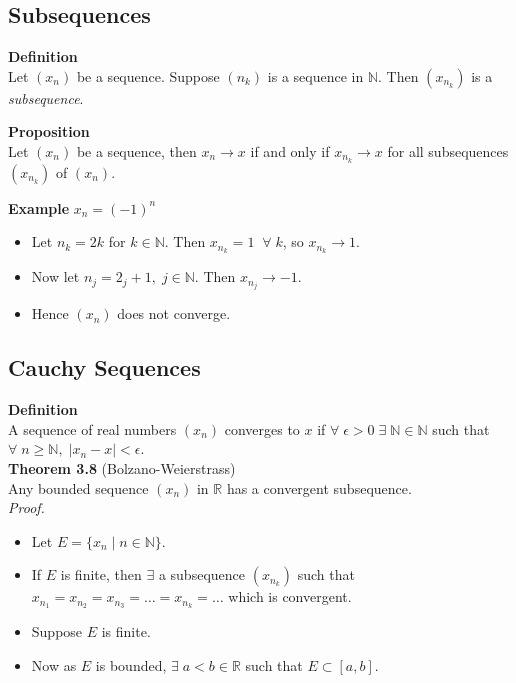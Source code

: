 \documentclass[12pt]{article}
\newcommand{\N}{\mathbb{N}}
\begin{document}
\subsection{Subsequences}
\begin{block}{\bf Definition}\\ Let $(x_n)$ be a sequence. Suppose $(n_k)$ is a sequence in $\mathbb{N}$. Then $(x_{n_k})$ is a {\sl subsequence}.

\vspace{1\baselineskip}
{\bf Proposition}\\ Let $(x_n)$ be a sequence, then $x_n\to x$ if and only if $x_{n_k}\to x$ for all subsequences $(x_{n_k})$ of $(x_n).$

\vspace{1\baselineskip}
{\bf Example} $x_n=(-1)^n$
\begin{itemize}
    \item Let $n_k=2k$ for $k\in\mathbb{N}$. Then $x_{n_k}=1\;\;\forall\;k$, so $x_{n_k}\to 1$.
    \item Now let $n_j = 2_j+1,\;j\in\mathbb{N}$. Then $x_{n_j}\to -1$. 
    \item Hence $(x_n)$ does not converge. 
\end{itemize}

\subsection{Cauchy Sequences}
\textbf{Definition}\\
A sequence of real numbers $(x_n)$ converges to $x$ if 
$\forall\;\epsilon > 0\;\exists\;\N\in\mathbb{N}$ such that $\forall\; n \ge \mathbb{N}, \; |x_n - x| < \epsilon$.\\

\textbf{Theorem 3.8} (Bolzano-Weierstrass)\\
Any bounded sequence $(x_n)$ in $\mathbb{R}$ has a convergent subsequence.\\

{\sl Proof.}
\begin{itemize}
    \item Let $E = \{x_n\;|\; n \in \mathbb{N}\}$. 
    \item If $E$ is finite, then $\exists$ a subsequence $(x_{n_k})$ such that $x_{n_1}=x_{n_2}=x_{n_3}=\ldots=x_{n_k}=\ldots$ which is convergent.
    \item Suppose $E$ is finite.
    \item Now as $E$ is bounded, $\exists\;a<b\in\mathbb{R}$ such that $E\subset[a,b].$
\end{itemize}\\



\end{block}
\end{document}
